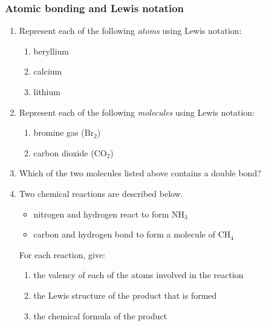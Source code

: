             \subsubsection{  Atomic bonding and Lewis notation
      }
            \nopagebreak
      \label{m38701*id140889}\begin{enumerate}[noitemsep, label=\textbf{\arabic*}. ] 
            \label{m38701*uid23}\item Represent each of the following \textsl{atoms} using Lewis notation:
\label{m38701*id140910}\begin{enumerate}[noitemsep, label=\textbf{\alph*}. ] 
            \label{m38701*uid24}\item beryllium
\label{m38701*uid25}\item calcium
\label{m38701*uid26}\item lithium
\end{enumerate}
                \label{m38701*uid27}\item Represent each of the following \textsl{molecules} using Lewis notation:
\label{m38701*id140969}\begin{enumerate}[noitemsep, label=\textbf{\alph*}. ] 
            \label{m38701*uid28}\item bromine gas ($\mathrm{Br}{}_{2}$)
\label{m38701*uid29}\item carbon dioxide ($\mathrm{CO}{}_{2}$)
\end{enumerate}
                \label{m38701*uid30}\item Which of the two molecules listed above contains a double bond?\newline
\label{m38701*uid31}\item Two chemical reactions are described below.
\label{m38701*id141048}\begin{itemize}[noitemsep]
            \label{m38701*uid32}\item nitrogen and hydrogen react to form $\mathrm{NH}{}_{3}$\label{m38701*uid33}\item carbon and hydrogen bond to form a molecule of $\mathrm{CH}{}_{4}$\end{itemize}
For each reaction, give:
\label{m38701*id141106}\begin{enumerate}[noitemsep, label=\textbf{\alph*}. ] 
            \label{m38701*uid34}\item the valency of each of the atoms involved in the reaction
\label{m38701*uid35}\item the Lewis structure of the product that is formed
\label{m38701*uid36}\item the chemical formula of the product

\end{enumerate}
\end{enumerate}
